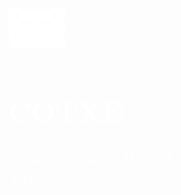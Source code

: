 \documentclass[../main.tex]{subfiles}
\begin{document}
\hspace*{0.2cm}
    \begin{minipage}[t]{2cm}
        \vspace*{0.9cm}\includegraphics[width=1.5cm]{assets/car.png}
    \end{minipage}
    \begin{minipage}[t]{5cm}
    
        \vspace*{0.75cm}
        \section*{\textcolor{white}{COTXE}}
        \vspace*{-0.25cm}
        \textcolor{white}{
            Carnet de conduir B [2019] \\
            Amb vehicle propi
        }
    \end{minipage}
\end{document}
